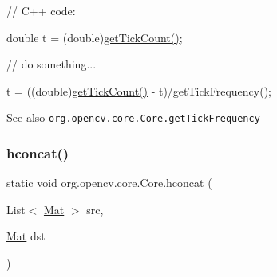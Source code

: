 {\ttfamily // C++ code\+:}

{\ttfamily }

{\ttfamily }

{\ttfamily double t = (double)\mbox{\hyperlink{classorg_1_1opencv_1_1core_1_1_core_adffc76724114188de1dcad5582ce7631}{get\+Tick\+Count()}};}

{\ttfamily }

{\ttfamily }

{\ttfamily // do something...}

{\ttfamily }

{\ttfamily }

{\ttfamily t = ((double)\mbox{\hyperlink{classorg_1_1opencv_1_1core_1_1_core_adffc76724114188de1dcad5582ce7631}{get\+Tick\+Count()}} -\/ t)/get\+Tick\+Frequency();}

{\ttfamily }

{\ttfamily \begin{DoxySeeAlso}{See also}
\href{http://docs.opencv.org/modules/core/doc/utility_and_system_functions_and_macros.html#gettickfrequency}{\tt org.\+opencv.\+core.\+Core.\+get\+Tick\+Frequency} 
\end{DoxySeeAlso}
}\mbox{\label{classorg_1_1opencv_1_1core_1_1_core_ae809cca27285b20fc31b42ffb7e5b5cb}} 
\subsubsection{\texorpdfstring{hconcat()}{hconcat()}}
{\footnotesize\ttfamily static void org.\+opencv.\+core.\+Core.\+hconcat (\begin{DoxyParamCaption}\item[{List$<$ \mbox{\hyperlink{classorg_1_1opencv_1_1core_1_1_mat}{Mat}} $>$}]{src,  }\item[{\mbox{\hyperlink{classorg_1_1opencv_1_1core_1_1_mat}{Mat}}}]{dst }\end{DoxyParamCaption})\hspace{0.3cm}{\ttfamily [static]}}

\mbox{\label{classorg_1_1opencv_1_1core_1_1_core_a64eb690877f2d4ac16c1b1c3375c0b7b}} 
